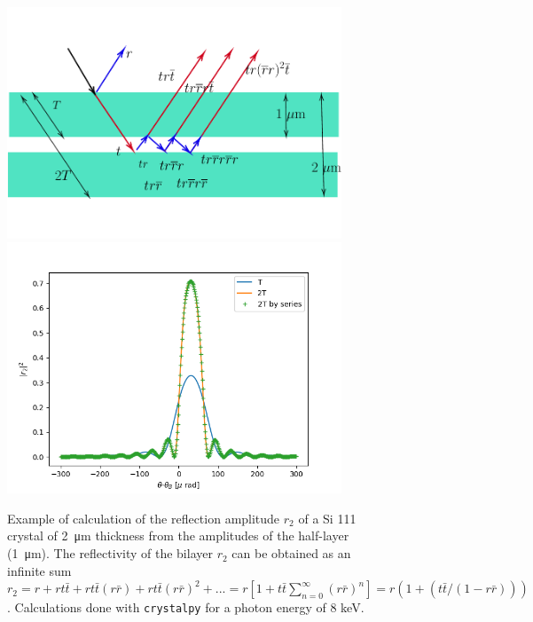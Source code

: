 \documentclass[preprint]{iucr}              %
\begin{document}
\begin{figure}\label{fig:doublelayer}
    \centering
    \includegraphics[width=0.89\textwidth]{figures/figlayered2.pdf}
    \includegraphics[width=0.89\textwidth]{figures/doublelayer2.png}
    \caption{Example of calculation of the reflection amplitude $r_2$ of a Si 111 crystal of \SI{2}{\micro\meter} thickness from the amplitudes of the half-layer (\SI{1}{\micro\meter}). The reflectivity of the bilayer $r_2$ can be obtained as an infinite sum $r_2 = r + r t \bar{t} + r t \bar{t} (r \bar{r}) + r t \bar{t} (r \bar{r})^2 + ...= r[1 + t \bar{t}\sum_{n=0}^{\infty}(r\bar{r})^n]=r(1 + (t \bar{t} / (1-r \bar{r})))$. Calculations done with {\tt crystalpy} for a photon energy of 8 keV.}
\end{figure}
\end{document}
